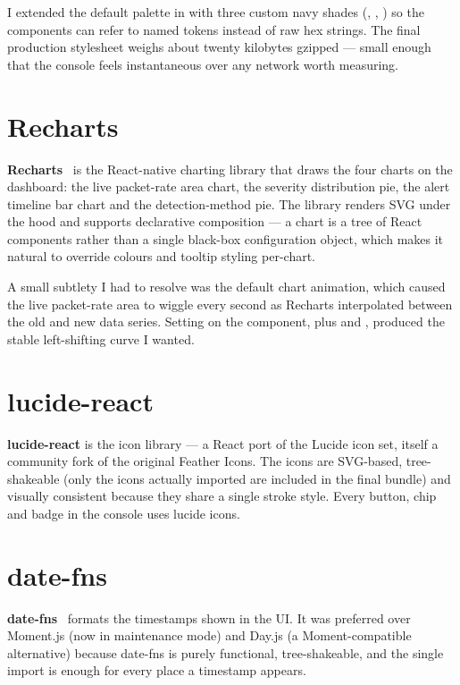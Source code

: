 I extended the default palette in  with
three custom navy shades (, ,
) so the components can refer to named tokens
instead of raw hex strings. The final production stylesheet
weighs about twenty kilobytes gzipped --- small enough that the
console feels instantaneous over any network worth measuring.

\section{Recharts}
\label{sec:tech-recharts}

\textbf{Recharts}~\cite{recharts} is the React-native charting
library that draws the four charts on the dashboard: the live
packet-rate area chart, the severity distribution pie, the alert
timeline bar chart and the detection-method pie. The library renders
SVG under the hood and supports declarative composition --- a chart
is a tree of React components rather than a single black-box
configuration object, which makes it natural to override colours and
tooltip styling per-chart.

A small subtlety I had to resolve was the default chart animation,
which caused the live packet-rate area to wiggle every second as
Recharts interpolated between the old and new data series. Setting
 on the  component, plus
 and , produced the stable
left-shifting curve I wanted.

\section{lucide-react}
\label{sec:tech-lucide}

\textbf{lucide-react} is the icon library --- a React port of the
Lucide icon set, itself a community fork of the original Feather
Icons. The icons are SVG-based, tree-shakeable (only the icons
actually imported are included in the final bundle) and visually
consistent because they share a single stroke style. Every button,
chip and badge in the console uses lucide icons.

\section{date-fns}
\label{sec:tech-datefns}

\textbf{date-fns}~\cite{datefns} formats the timestamps shown in the
UI. It was preferred over Moment.js (now in maintenance mode) and
Day.js (a Moment-compatible alternative) because date-fns is purely
functional, tree-shakeable, and the single  import is
enough for every place a timestamp appears.

